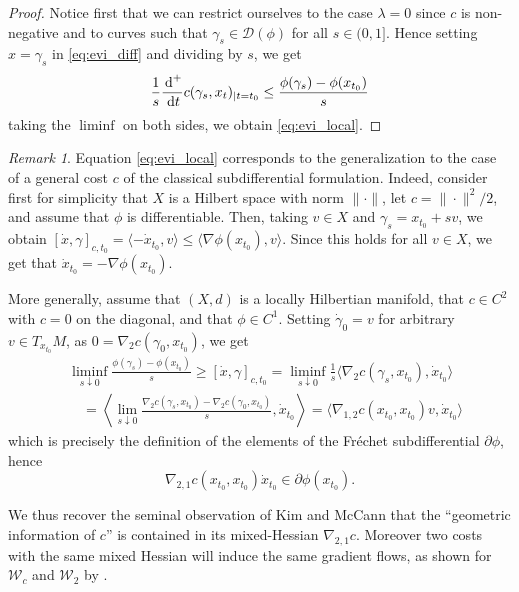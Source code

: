 \documentclass[reqno]{amsart}
\newcounter{results}[section]
\theoremstyle{plain}
\theoremstyle{remark}
\newtheorem{remark}[results]{Remark}
\theoremstyle{plain}
\numberwithin{equation}{section}
\theoremstyle{remark}
\newcommand{\calW}{\mathcal{W}}
\newcommand{\de}{{\,\rm d}}
\newcommand{\dom}[1]{\mathscr{D}(#1)}
\newcommand{\bracket}[1]{\langle #1 \rangle}
\begin{document}
\begin{proof}
    Notice first that we can  restrict ourselves  to the case $\lambda=0$ since $c$ is non-negative and to curves such that $\gamma_s\in\dom{\phi}$ for all $s\in(0,1]$. Hence setting $x=\gamma_s$ in \eqref{eq:evi_diff} and dividing by $s$, we get
    \begin{equation*}
       \frac{1}{s} \frac{\de^+}{\de t} c(\gamma_s, x_t)_{|t=t_0} \le \frac{\phi(\gamma_s)-\phi(x_{t_0})}{s}
    \end{equation*}
    taking the $\liminf$ on both sides, we obtain \eqref{eq:evi_local}.
\end{proof}
\begin{remark}\label{rmk:subdifferential}
     Equation \eqref{eq:evi_local} corresponds to the generalization to the case of a general cost $c$ of the classical subdifferential formulation.  
    Indeed, consider first for simplicity that $X$ is a Hilbert space  with norm $\| \cdot \|$,  let  $c={\|\cdot\|^2}/{2}$,  and  assume that $\phi$ is differentiable.  Then, taking $v\in X$ and $ \gamma_s=x_{t_0}+sv$, we obtain $[\dot x, \gamma]_{c,t_0}=\bracket{-\dot x_{t_0},v} \le \bracket{\nabla \phi(x_{t_0}),v}$. Since this holds for all $v  \in X$,  we get  that $\dot x_{t_0}=-\nabla \phi(x_{t_0})$. 
    
    More generally, assume that $(X,d)$ is a  locally Hilbertian manifold, that $c\in C^2$ with $c = 0$  on the diagonal, and that  $\phi \in C^1$.  Setting  $\dot \gamma_0=v$  for arbitrary $v \in T_{x_{t_0}}M$, as $0=\nabla_2 c(\gamma_0, x_{t_0})$, we get 
    \begin{align}
    &\liminf_{s\downarrow 0} \frac{\phi(\gamma_s)-\phi(x_{t_0})}{s} \ge [\dot x, \gamma]_{c,t_0}=\liminf_{s\downarrow 0} \frac1s \bracket{\nabla_2 c(\gamma_s, x_{t_0}),\dot x_{t_0}}\nonumber\\
    &\quad = \left\langle\lim_{s\downarrow 0}\frac{\nabla_2 c(\gamma_s, x_{t_0})-\nabla_2 c(\gamma_0, x_{t_0})}{s},\dot x_{t_0}\right\rangle=\bracket{\nabla_{1,2} c(x_{t_0}, x_{t_0}) v,\dot x_{t_0}}\label{eq:evi_local2}
    \end{align}
    which is precisely the definition of the elements of the  Fr\'echet  subdifferential $\partial \phi$, hence $$\nabla_{2,1} c(x_{t_0}, x_{t_0})\dot x_{t_0} \in \partial \phi(x_{t_0}).$$

    We thus recover the seminal observation of Kim and McCann \cite[Section 2]{KimMcCann2010} that the ``geometric information of $c$'' is contained in its mixed-Hessian $\nabla_{2,1} c$. Moreover two costs with the same mixed Hessian will induce the same gradient flows, as shown for $\calW_c$ and $\calW_2$ by \cite{rankin2024jkoschemesgeneraltransport}.
\end{remark}
\end{document}
